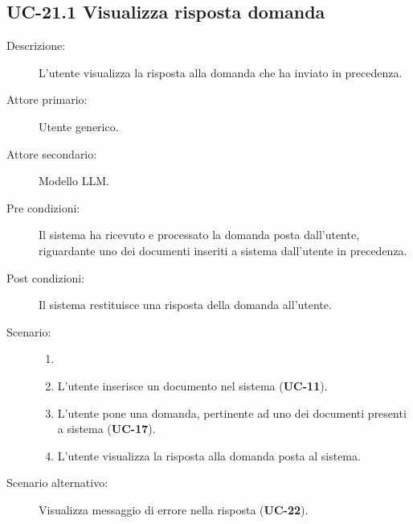 \subsection{UC-21.1 Visualizza risposta domanda}
\begin{description}
    \item[Descrizione:] L'utente visualizza la risposta alla domanda che ha inviato in precedenza.
    \item[Attore primario:] Utente generico.
    \item[Attore secondario:] Modello LLM. 
    \item[Pre condizioni:] Il sistema ha ricevuto e processato la domanda posta dall'utente, riguardante uno dei documenti inseriti a sistema dall'utente in precedenza.
    \item[Post condizioni:] Il sistema restituisce una risposta della domanda all'utente.
    \item[Scenario:]
    \begin{enumerate}
        \item[]
        \item L’utente inserisce un documento nel sistema (\textbf{UC-11}).
        \item L’utente pone una domanda, pertinente ad uno dei documenti presenti a sistema (\textbf{UC-17}).
        \item L'utente visualizza la risposta alla domanda posta al sistema.
    \end{enumerate}
    \item[Scenario alternativo:] Visualizza messaggio di errore nella risposta (\textbf{UC-22}).
\end{description}

